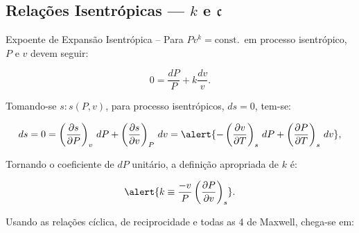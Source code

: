 \subsection{Relações Isentrópicas --- $k$ e $\mathfrak{c}$}

    \begin{frame}[allowframebreaks]{Expoente de Expansão Isentrópica --}\vspace*{-0em}
        Para \alert{$Pv^k = \mbox{const.}$}~em processo isentrópico, \alert{$P$} e \alert{$v$}
        devem seguir:

        \begin{equation*}
            0 = \frac{dP}{P} + k\frac{dv}{v}.
        \end{equation*}

        Tomando-se \alert{$s\!:\!s(P, v)$}, para processo isentrópicos, \alert{$ds = 0$},
        tem-se:

        \begin{equation*}
            ds = 0 =
                \left(
                    \frac{\partial s}{\partial P}
                \right)_v\,dP +
                \left(
                    \frac{\partial s}{\partial v}
                \right)_P\,dv = \alert{
                -\left(
                    \frac{\partial v}{\partial T}
                \right)_s\,dP +
                \left(
                    \frac{\partial P}{\partial T}
                \right)_s\,dv
            },
        \end{equation*}

        \pagebreak
        Tornando o coeficiente de \alert{$dP$} unitário, a definição apropriada de \alert{$k$}
        é:

        \begin{equation*}
            \alert{
                k \equiv
                    \frac{-v}{P}
                    \left(
                        \frac{\partial P}{\partial v}
                    \right)_s
            }.
        \end{equation*}\vspace*\medskipamount

        Usando as relações \alert{cíclica}, de \alert{reciprocidade} e todas as \alert{4 de
        Maxwell}, chega-se em:


\end{frame}
